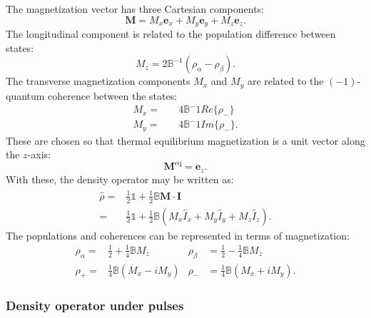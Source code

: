The magnetization vector has three Cartesian components:
\begin{equation}
  \mathbf{M} = M_x\mathbf{e}_x + M_y\mathbf{e}_y + M_z\mathbf{e}_z.
\end{equation}
 The longitudinal component is related to the population difference between states:
 \begin{equation}
   M_z = 2\mathbb{B}^{-1}(\rho_\alpha - \rho_\beta).
 \end{equation}
The transverse magnetization components $M_x$ and $M_y$ are related to the $(-1)$-quantum coherence between the states:
\begin{align}
  M_x =&\quad4\mathbb{B}^-1Re\{\rho_-\}\\
  M_y =&\quad4\mathbb{B}^-1Im\{\rho_-\}.
\end{align}
These are chosen so that thermal equilibrium magnetization is a unit vector
along the $z$-axis:
\begin{equation}
  \mathbf{M}^{\text{eq}} = \mathbf{e}_z.
\end{equation}
With these, the density operator may be written as:
\begin{align}
  \hat{\rho} =& \frac{1}{2}\mathbb{1} + \frac{1}{2}\mathbb{B}\mathbf{M}\cdot\hat{\mathbf{I}}\\
  =& \frac{1}{2}\mathbb{1} + \frac{1}{2}\mathbb{B}(M_x\hat{I}_x + M_y\hat{I}_y + M_z\hat{I}_z).
\end{align}
The populations and coherences can be represented in terms of magnetization:
\begin{align}
  \rho_\alpha =& \frac{1}{2} + \frac{1}{4}\mathbb{B}M_z & \rho_\beta &= \frac{1}{2} - \frac{1}{4}\mathbb{B}M_z\\
  \rho_+ =&  \frac{1}{4}\mathbb{B}(M_x - iM_y) & \rho_- &= \frac{1}{4}\mathbb{B}(M_x + iM_y).
\end{align}

\subsubsection{Density operator under pulses}

